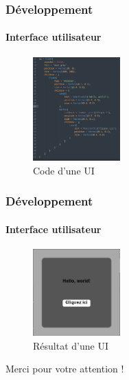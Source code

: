 \begin{frame}
	\frametitle{Développement}
	\framesubtitle{Interface utilisateur}
	\begin{figure}
		\includegraphics[width=0.3\textwidth]{img/code_ui.png}
		\caption{Code d'une UI}
	\end{figure}
\end{frame}
\begin{frame}
	\frametitle{Développement}
	\framesubtitle{Interface utilisateur}
	\begin{figure}
		\includegraphics[width=0.3\textwidth]{img/ui.png}
		\caption{Résultat d'une UI}
	\end{figure}

\end{frame}

\begin{frame}[plain] %
  \centering
  \Huge Merci pour votre attention !\\[1cm]
\end{frame}
